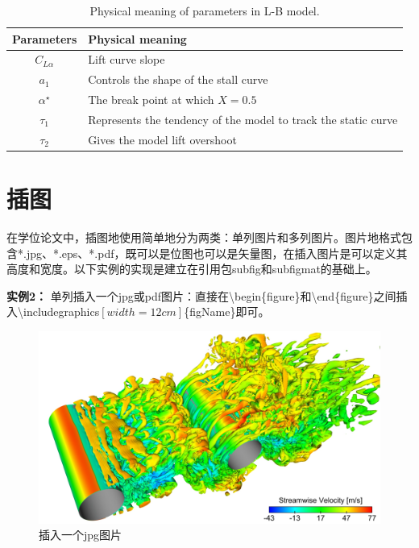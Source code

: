 \begin{table}[htb]               %
\centering
 \begin{center}
  \caption{Physical meaning of parameters in L-B model.}
  \label{tab:LB-parameters}
  \begin{tabular}{cl}
      \toprule
       Parameters & Physical meaning       \\
      \midrule   %
       $C_{L\alpha}$ & Lift curve slope \\
       $a_{1}$ & Controls the shape of the stall curve \\
       $\alpha^{\star}$ & The break point at which $X=0.5$ \\
       $\tau_{1}$ & Represents the tendency of the model to track the static curve \\
       $\tau_{2}$ & Gives the model lift overshoot \\
      \bottomrule
  \end{tabular}
 \end{center}
\end{table}

\section{插图}
\label{sec:fig}

在学位论文中，插图地使用简单地分为两类：单列图片和多列图片。图片地格式包含*.jpg、*.eps、*.pdf，既可以是位图也可以是矢量图，在插入图片是可以定义其高度和宽度。以下实例的实现是建立在引用包subfig和subfigmat的基础上。

{\bf{实例2：}} 单列插入一个jpg或pdf图片：直接在\textbackslash begin\{figure\}和\textbackslash end\{figure\}之间插入\textbackslash includegraphics$\left[width=12cm\right]$\{figName\}即可。

\begin{figure}[htb]
\centering
   \includegraphics[width=12cm]{./img/visual_jpg}
  \caption{插入一个jpg图片}
  \label{fig:visual}
\end{figure}

